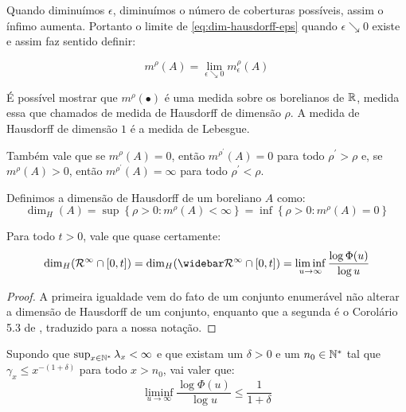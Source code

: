 Quando diminuímos $\epsilon$, diminuímos o número de coberturas
possíveis, assim o ínfimo aumenta. Portanto o limite de
\eqref{eq:dim-hausdorff-eps} quando $\epsilon \searrow 0$ existe e
assim faz sentido definir:

\begin{displaymath}
  m^\rho(A) = \lim_{\epsilon \searrow 0} m^\rho_\epsilon (A)
\end{displaymath}

É possível mostrar que $m^\rho(\bullet)$ é uma medida sobre os
borelianos de ${\mathbb{R}}$, medida essa que chamados de medida de Hausdorff de
dimensão $\rho$.  A medida de Hausdorff de dimensão $1$ é a medida de
Lebesgue.

Também vale que se $m^\rho(A) = 0$, então $m^{\rho^\prime}(A) = 0$ para
todo $\rho^\prime > \rho$ e, se $m^\rho(A) > 0$, então $m^{\rho^\prime}(A)
= \infty$ para todo $\rho^\prime < \rho$.

\begin{definicao}
  Definimos a dimensão de Hausdorff de um boreliano $A$ como:
  \begin{displaymath}
    \dim_H(A) = \sup \left\{ \rho > 0 : m^\rho(A) < \infty \right\}
    = \inf \left\{ \rho > 0: m^\rho(A) = 0 \right\}
  \end{displaymath}
\end{definicao}

\begin{teorema}
  \label{teo:dim-hausdorff}
  Para todo $t > 0$, vale que quase certamente:
  \begin{equation}
    \label{eq:dim-hausdorff}
    \dim_H(\RR^\infty \cap [0, t]) = 
    \dim_H(\RRb^\infty \cap [0, t]) =
    \liminf_{u \to \infty} \frac{\log \Phi(u)}{\log u}
  \end{equation}
\end{teorema}
\begin{proof}
  A primeira igualdade vem do fato de um conjunto enumerável não
  alterar a dimensão de Hausdorff de um conjunto, enquanto que a
  segunda é o Corolário 5.3 de \cite{bertoin:97}, traduzido para a
  nossa notação.
\end{proof}

\begin{proposicao}
  \label{prop:dominar-dim-haus-sup}
  Supondo que $\sup_{x\in{\mathbb{N^*}}}\lambda_x < \infty$ e que existam um
  $\delta>0$ e um $n_0 \in {\mathbb{N^*}}$ tal que $\gamma_x \leq x^{-(1+\delta)}$
  para todo $x > n_0$, vai valer que:
  \begin{equation}
    \liminf_{u \to \infty} \frac{\log \Phi(u)}{\log u}  \leq \frac{1}{1+\delta}
  \end{equation}
\end{proposicao}


